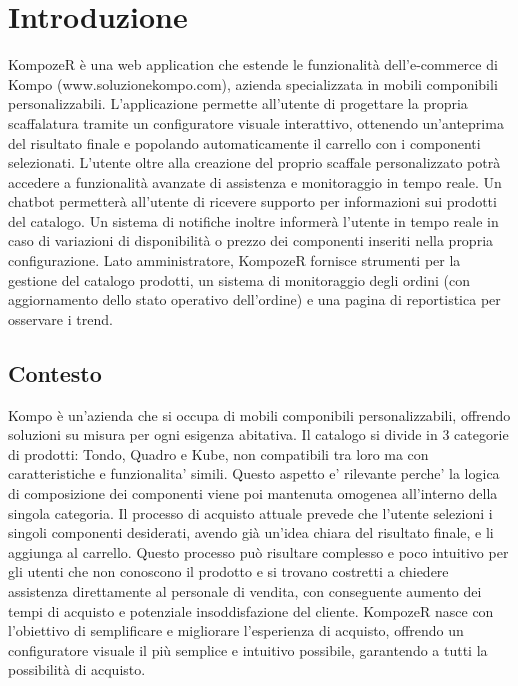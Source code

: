 \section{Introduzione}

KompozeR è una web application che estende le funzionalità dell'e-commerce di Kompo (www.soluzionekompo.com), azienda specializzata in mobili componibili personalizzabili. 
L'applicazione permette all'utente di progettare la propria scaffalatura tramite un configuratore visuale interattivo, ottenendo un'anteprima del risultato finale e popolando automaticamente il carrello con i componenti selezionati.
L'utente oltre alla creazione del proprio scaffale personalizzato potrà accedere a funzionalità avanzate di assistenza e monitoraggio in tempo reale. 
Un chatbot permetterà all'utente di ricevere supporto per informazioni sui prodotti del catalogo. 
Un sistema di notifiche inoltre informerà l'utente in tempo reale in caso di variazioni di disponibilità o prezzo dei componenti inseriti nella propria configurazione.
Lato amministratore, KompozeR fornisce strumenti per la gestione del catalogo prodotti, un sistema di monitoraggio degli ordini (con aggiornamento dello stato operativo dell'ordine) e una pagina di reportistica per osservare i trend.

\subsection{Contesto}
Kompo è un'azienda che si occupa di mobili componibili personalizzabili, offrendo soluzioni su misura per ogni esigenza abitativa.
Il catalogo si divide in 3 categorie di prodotti: Tondo, Quadro e Kube, non compatibili tra loro ma con caratteristiche e funzionalita' simili. Questo aspetto e' rilevante perche' la logica di composizione dei componenti viene poi mantenuta omogenea all'interno della singola categoria.
Il processo di acquisto attuale prevede che l'utente selezioni i singoli componenti desiderati, avendo già un'idea chiara del risultato finale, e li aggiunga al carrello.
Questo processo può risultare complesso e poco intuitivo per gli utenti che non conoscono il prodotto e si trovano costretti a chiedere assistenza direttamente al personale di vendita, con conseguente aumento dei tempi di acquisto e potenziale insoddisfazione del cliente.
KompozeR nasce con l'obiettivo di semplificare e migliorare l'esperienza di acquisto, offrendo un configuratore visuale il più semplice e intuitivo possibile, garantendo a tutti la possibilità di acquisto.

\newpage